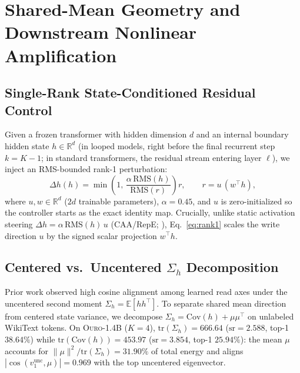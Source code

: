 \documentclass[10pt,twocolumn]{article}
\begin{document}
\section{Shared-Mean Geometry and Downstream Nonlinear Amplification}
\label{sec:geometry}

\subsection{Single-Rank State-Conditioned Residual Control}
Given a frozen transformer with hidden dimension $d$ and an internal boundary hidden state $h\in\mathbb{R}^d$ (in looped models, right before the final recurrent step $k=K-1$; in standard transformers, the residual stream entering layer $\ell$), we inject an RMS-bounded rank-1 perturbation:
\begin{equation}
\label{eq:rank1}
\Delta h(h) = \min\!\left(1,\, \frac{\alpha\,\mathrm{RMS}(h)}{\mathrm{RMS}(r)}\right) r, \qquad r = u\,(w^\top h),
\end{equation}
where $u,w\in\mathbb{R}^d$ ($2d$ trainable parameters), $\alpha=0.45$, and $u$ is zero-initialized so the controller starts as the exact identity map. Crucially, unlike static activation steering $\Delta h = \alpha\,\mathrm{RMS}(h)\,u$ (CAA/RepE; \citealp{zou2023representation,rimsky2024steering}), Eq.~\eqref{eq:rank1} scales the write direction $u$ by the signed scalar projection $w^\top h$.

\subsection{Centered vs.\ Uncentered $\Sigma_h$ Decomposition}
Prior work observed high cosine alignment among learned read axes under the uncentered second moment $\Sigma_h = \mathbb{E}[hh^\top]$. To separate shared mean direction from centered state variance, we decompose $\Sigma_h = \mathrm{Cov}(h) + \mu\mu^\top$ on unlabeled WikiText tokens.
On \textsc{Ouro-1.4B} ($K=4$), $\mathrm{tr}(\Sigma_h)=666.64$ ($\mathrm{sr}=2.588$, top-1 $38.64\%$) while $\mathrm{tr}(\mathrm{Cov}(h))=453.97$ ($\mathrm{sr}=3.854$, top-1 $25.94\%$): the mean $\mu$ accounts for $\|\mu\|^2/\mathrm{tr}(\Sigma_h)=31.90\%$ of total energy and aligns $|\cos(v_1^{\mathrm{unc}},\mu)|=0.969$ with the top uncentered eigenvector.
\end{document}
